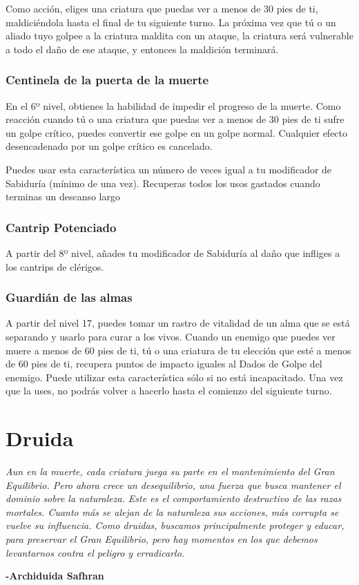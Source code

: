 \documentclass[a4paper,twocolumn,openany,10pt]{dndbook}
\begin{document}
Como acción, eliges una criatura que puedas ver a menos de 30 pies de ti, maldiciéndola hasta el final de tu siguiente turno. La
próxima vez que tú o un aliado tuyo golpee a la criatura maldita con un ataque, la criatura será vulnerable a todo el daño de
ese ataque, y entonces la maldición terminará. 

\subsubsection{Centinela de la puerta de la muerte}
En el 6º nivel, obtienes la habilidad de impedir el progreso de la muerte. Como reacción cuando tú o una criatura que puedas ver
a menos de 30 pies de ti sufre un golpe crítico, puedes convertir ese golpe en un golpe normal. Cualquier efecto desencadenado
por un golpe crítico es cancelado.

Puedes usar esta característica un número de veces igual a tu modificador de Sabiduría (mínimo de una vez). Recuperas todos los
usos gastados cuando terminas un descanso largo

\subsubsection{Cantrip Potenciado}
A partir del 8º nivel, añades tu modificador de Sabiduría al daño que infliges a los cantrips de clérigos. 

\subsubsection{Guardián de las almas}
A partir del nivel 17, puedes tomar un rastro de vitalidad de un alma que se está separando y usarlo para curar a los vivos.
Cuando un enemigo que puedes ver muere a menos de 60 pies de ti, tú o una criatura de tu elección que esté a menos de 60 pies de
ti, recupera puntos de impacto iguales al Dados de Golpe del enemigo. Puede utilizar esta característica sólo si no está
incapacitado. Una vez que la uses, no podrás volver a hacerlo hasta el comienzo del siguiente turno. 

\section{Druida}

\begin{quotebox}
	\textit{Aun en la muerte, cada criatura juega su parte en el mantenimiento del Gran Equilibrio. Pero ahora crece un
	desequilibrio, una fuerza que busca mantener el dominio sobre la naturaleza. Este es el comportamiento destructivo de las
	razas mortales. Cuanto más se alejan de la naturaleza sus acciones, más corrupta se vuelve su influencia. Como druidas,
	buscamos principalmente proteger y educar, para preservar el Gran Equilibrio, pero hay momentos en los que debemos
	levantarnos contra el peligro y erradicarlo.}

	\begin{flushright}
	\textbf{-Archiduida Safhran}
	\end{flushright}
\end{quotebox}
\end{document}
